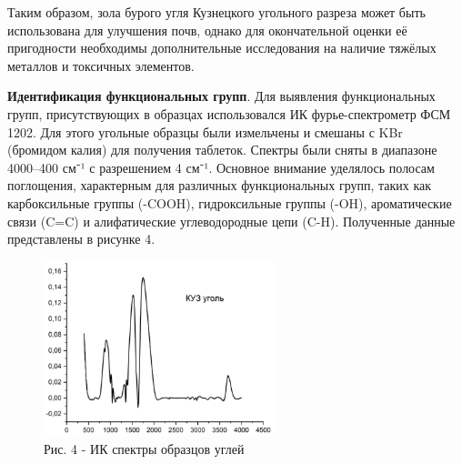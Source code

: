 \begin{multicols}{2}
Таким образом, зола бурого угля Кузнецкого угольного разреза может быть
использована для улучшения почв, однако для окончательной оценки её
пригодности необходимы дополнительные исследования на наличие тяжёлых
металлов и токсичных элементов.

{\bfseries Идентификация функциональных групп}. Для выявления
функциональных групп, присутствующих в образцах использовался ИК
фурье-спектрометр ФСМ 1202. Для этого угольные образцы были измельчены и
смешаны с KBr (бромидом калия) для получения таблеток. Спектры были
сняты в диапазоне 4000--400 см⁻¹ с разрешением 4 см⁻¹. Основное внимание
уделялось полосам поглощения, характерным для различных функциональных
групп, таких как карбоксильные группы (-COOH), гидроксильные группы
(-OH), ароматические связи (C=C) и алифатические углеводородные цепи
(C-H). Полученные данные представлены в рисунке 4.
\end{multicols}

\begin{figure}[H]
	\centering
	\includegraphics[width=0.6\textwidth]{media/gorn3/image12}
	\caption*{Рис. 4 - ИК спектры образцов углей}
\end{figure}

